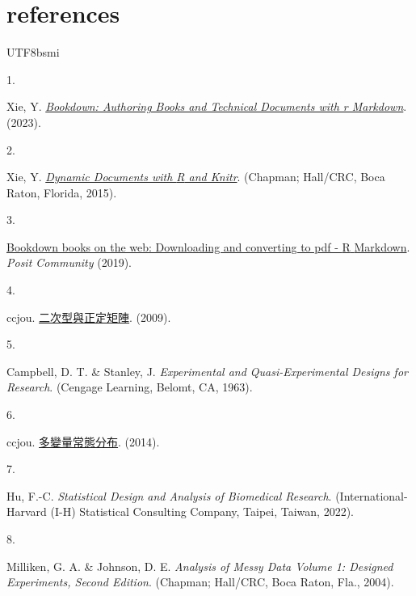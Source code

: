 \documentclass[
]{book}
\newlength{\cslhangindent}
\newlength{\csllabelwidth}
\newenvironment{CSLReferences}[2] %
 {\begin{list}{}{%
  \setlength{\itemindent}{0pt}
  \setlength{\leftmargin}{0pt}
  \setlength{\parsep}{0pt}
  \ifodd #1
   \setlength{\leftmargin}{\cslhangindent}
   \setlength{\itemindent}{-1\cslhangindent}
  \fi
  \setlength{\itemsep}{#2\baselineskip}}}
 {\end{list}}
\newcommand{\CSLLeftMargin}[1]{\parbox[t]{\csllabelwidth}{\strut#1\strut}}
\newcommand{\CSLRightInline}[1]{\parbox[t]{\linewidth - \csllabelwidth}{\strut#1\strut}}
\theoremstyle{definition}
\theoremstyle{definition}
\theoremstyle{definition}
\theoremstyle{definition}
\theoremstyle{remark}
\begin{document}
\chapter*{references}\label{references}
\begin{CJK}{UTF8}{bsmi}
\label{refs}
\begin{CSLReferences}{0}{0}
\CSLLeftMargin{1. }%
\CSLRightInline{Xie, Y. \emph{\href{https://CRAN.R-project.org/package=bookdown}{Bookdown: Authoring Books and Technical Documents with r Markdown}}. (2023).}

\CSLLeftMargin{2. }%
\CSLRightInline{Xie, Y. \emph{\href{http://yihui.org/knitr/}{Dynamic Documents with {R} and Knitr}}. (Chapman; Hall/CRC, Boca Raton, Florida, 2015).}

\CSLLeftMargin{3. }%
\CSLRightInline{\href{https://community.rstudio.com/t/bookdown-books-on-the-web-downloading-and-converting-to-pdf/30268}{Bookdown books on the web: Downloading and converting to pdf - {R} {Markdown}}. \emph{Posit Community} (2019).}

\CSLLeftMargin{4. }%
\CSLRightInline{ccjou. \href{https://ccjou.wordpress.com/2009/10/21/\%e4\%ba\%8c\%e6\%ac\%a1\%e5\%9e\%8b\%e8\%88\%87\%e6\%ad\%a3\%e5\%ae\%9a\%e7\%9f\%a9\%e9\%99\%a3/}{二次型與正定矩陣}. (2009).}

\CSLLeftMargin{5. }%
\CSLRightInline{Campbell, D. T. \& Stanley, J. \emph{Experimental and Quasi-Experimental Designs for Research}. (Cengage Learning, Belomt, CA, 1963).}

\CSLLeftMargin{6. }%
\CSLRightInline{ccjou. \href{https://ccjou.wordpress.com/2014/06/05/\%e5\%a4\%9a\%e8\%ae\%8a\%e9\%87\%8f\%e5\%b8\%b8\%e6\%85\%8b\%e5\%88\%86\%e5\%b8\%83/}{多變量常態分布}. (2014).}

\CSLLeftMargin{7. }%
\CSLRightInline{Hu, F.-C. \emph{Statistical Design and Analysis of Biomedical Research}. (International-Harvard (I-H) Statistical Consulting Company, Taipei, Taiwan, 2022).}

\CSLLeftMargin{8. }%
\CSLRightInline{Milliken, G. A. \& Johnson, D. E. \emph{Analysis of Messy Data Volume 1: Designed Experiments, Second Edition}. (Chapman; Hall/CRC, Boca Raton, Fla., 2004).}


\end{CSLReferences}
\end{CJK}
\end{document}
